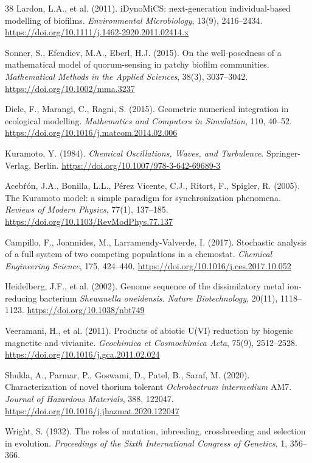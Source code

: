 \documentclass[11pt]{article}
\begin{document}
\begin{thebibliography}{38}
Lardon, L.A., et al. (2011).
iDynoMiCS: next-generation individual-based modelling of biofilms.
\textit{Environmental Microbiology}, 13(9), 2416--2434.
\url{https://doi.org/10.1111/j.1462-2920.2011.02414.x}

Sonner, S., Efendiev, M.A., Eberl, H.J. (2015).
On the well-posedness of a mathematical model of quorum-sensing in patchy biofilm communities.
\textit{Mathematical Methods in the Applied Sciences}, 38(3), 3037--3042.
\url{https://doi.org/10.1002/mma.3237}

Diele, F., Marangi, C., Ragni, S. (2015).
Geometric numerical integration in ecological modelling.
\textit{Mathematics and Computers in Simulation}, 110, 40--52.
\url{https://doi.org/10.1016/j.matcom.2014.02.006}

Kuramoto, Y. (1984).
\textit{Chemical Oscillations, Waves, and Turbulence}.
Springer-Verlag, Berlin.
\url{https://doi.org/10.1007/978-3-642-69689-3}

Aceb\'r\'on, J.A., Bonilla, L.L., P\'erez Vicente, C.J., Ritort, F., Spigler, R. (2005).
The Kuramoto model: a simple paradigm for synchronization phenomena.
\textit{Reviews of Modern Physics}, 77(1), 137--185.
\url{https://doi.org/10.1103/RevModPhys.77.137}

Campillo, F., Joannides, M., Larramendy-Valverde, I. (2017).
Stochastic analysis of a full system of two competing populations in a chemostat.
\textit{Chemical Engineering Science}, 175, 424--440.
\url{https://doi.org/10.1016/j.ces.2017.10.052}

Heidelberg, J.F., et al. (2002).
Genome sequence of the dissimilatory metal ion-reducing bacterium
\textit{Shewanella oneidensis}.
\textit{Nature Biotechnology}, 20(11), 1118--1123.
\url{https://doi.org/10.1038/nbt749}

Veeramani, H., et al. (2011).
Products of abiotic U(VI) reduction by biogenic magnetite and vivianite.
\textit{Geochimica et Cosmochimica Acta}, 75(9), 2512--2528.
\url{https://doi.org/10.1016/j.gca.2011.02.024}

Shukla, A., Parmar, P., Goswami, D., Patel, B., Saraf, M. (2020).
Characterization of novel thorium tolerant \textit{Ochrobactrum intermedium} AM7.
\textit{Journal of Hazardous Materials}, 388, 122047.
\url{https://doi.org/10.1016/j.jhazmat.2020.122047}

Wright, S. (1932).
The roles of mutation, inbreeding, crossbreeding and selection in evolution.
\textit{Proceedings of the Sixth International Congress of Genetics}, 1, 356--366.


\end{thebibliography}
\end{document}
